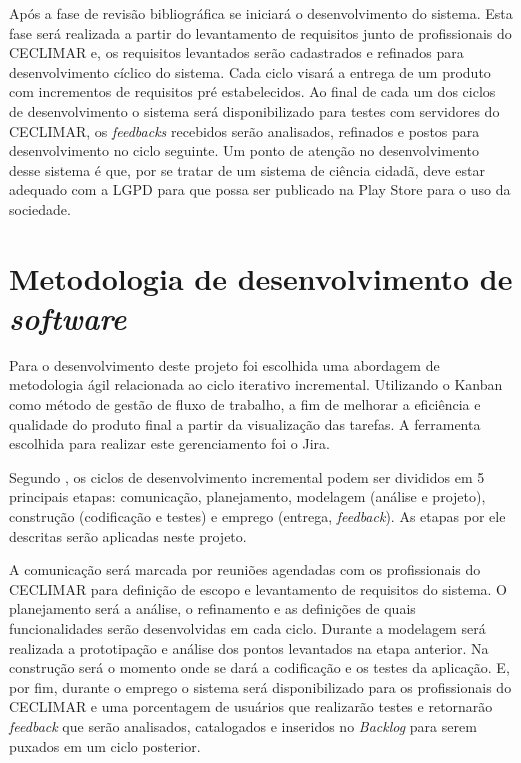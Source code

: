 Após a fase de revisão bibliográfica se iniciará o desenvolvimento do sistema. Esta fase será realizada a partir do levantamento de requisitos junto de profissionais do CECLIMAR e, os requisitos levantados serão cadastrados e refinados para desenvolvimento cíclico do sistema. Cada ciclo visará a entrega de um produto com incrementos de requisitos pré estabelecidos. Ao final de cada um dos ciclos de desenvolvimento o sistema será disponibilizado para testes com servidores do CECLIMAR, os \textit{feedbacks} recebidos serão analisados, refinados e postos para desenvolvimento no ciclo seguinte. Um ponto de atenção no desenvolvimento desse sistema é que, por se tratar de um sistema de ciência cidadã, deve estar adequado com a LGPD para que possa ser publicado na Play Store para o uso da sociedade.

\section{Metodologia de desenvolvimento de \textit{software}}

Para o desenvolvimento deste projeto foi escolhida uma abordagem de metodologia ágil relacionada ao ciclo iterativo incremental. Utilizando o Kanban como método de gestão de fluxo de trabalho, a fim de melhorar a eficiência e qualidade do produto final a partir da visualização das tarefas. A ferramenta escolhida para realizar este gerenciamento foi o Jira.

Segundo , os ciclos de desenvolvimento incremental podem ser divididos em 5 principais etapas: comunicação, planejamento, modelagem (análise e projeto), construção (codificação e testes) e emprego (entrega, \textit{feedback}). As etapas por ele descritas serão aplicadas neste projeto.

A comunicação será marcada por reuniões agendadas com os profissionais do CECLIMAR para definição de escopo e levantamento de requisitos do sistema. O planejamento será a análise, o refinamento e as definições de quais funcionalidades serão desenvolvidas em cada ciclo. Durante a modelagem será realizada a prototipação e análise dos pontos levantados na etapa anterior. Na construção será o momento onde se dará a codificação e os testes da aplicação. E, por fim, durante o emprego o sistema será disponibilizado para os profissionais do CECLIMAR e uma porcentagem de usuários que realizarão testes e retornarão \textit{feedback} que serão analisados, catalogados e inseridos no \textit{Backlog} para serem puxados em um ciclo posterior.


